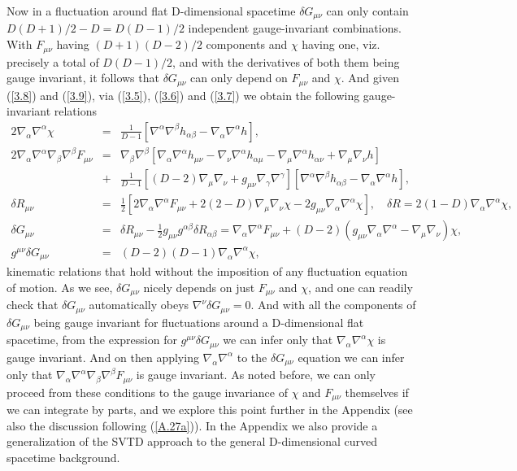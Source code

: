 \documentclass[aps,onecolumn,10pt]{revtex4}
\numberwithin{equation}{section}
\numberwithin{equation}{section}
\begin{document}
Now in a fluctuation around flat D-dimensional spacetime $\delta G_{\mu\nu}$ can only contain $D(D+1)/2-D=D(D-1)/2$ independent gauge-invariant combinations. With $F_{\mu\nu}$ having $(D+1)(D-2)/2$ components and $\chi$ having one, viz. precisely a total of $D(D-1)/2$, and  with the derivatives of both them being gauge invariant, it follows that $\delta G_{\mu\nu}$ can only depend on $F_{\mu\nu}$ and $\chi$. And given (\ref{3.8}) and (\ref{3.9}), via (\ref{3.5}), (\ref{3.6}) and (\ref{3.7}) we obtain  the following gauge-invariant relations
%
\begin{eqnarray}
2\nabla_{\alpha}\nabla^{\alpha}\chi&=&\frac{1}{D-1}\left[\nabla^{\alpha}\nabla^{\beta}h_{\alpha\beta}-\nabla_{\alpha}\nabla^{\alpha}h\right],
\nonumber\\
2\nabla_{\alpha}\nabla^{\alpha}\nabla_{\beta}\nabla^{\beta}F_{\mu\nu}&=&\nabla_{\beta}\nabla^{\beta}\left[\nabla_{\alpha}\nabla^{\alpha}h_{\mu\nu}-\nabla_{\nu}\nabla^{\alpha}h_{\alpha\mu}-\nabla_{\mu}\nabla^{\alpha}h_{\alpha\nu}+\nabla_{\mu}\nabla_{\nu}h\right]
\nonumber\\
&+&\frac{1}{D-1}\left[(D-2)\nabla_{\mu}\nabla_{\nu}+g_{\mu\nu}\nabla_{\gamma}\nabla^{\gamma}\right][\nabla^{\alpha}\nabla^{\beta}h_{\alpha\beta}-\nabla_{\alpha}\nabla^{\alpha}h],
\nonumber\\
\delta R_{\mu\nu}&=&\frac{1}{2}[2\nabla_{\alpha}\nabla^{\alpha}F_{\mu\nu}+2(2-D)\nabla_{\mu}\nabla_{\nu}\chi-2g_{\mu\nu}\nabla_{\alpha}\nabla^{\alpha}\chi], \quad \delta R=2(1-D)\nabla_{\alpha}\nabla^{\alpha}\chi,
\nonumber\\
\delta G_{\mu\nu}&=&\delta R_{\mu\nu}-\frac{1}{2}g_{\mu\nu}g^{\alpha\beta}\delta R_{\alpha\beta}=\nabla_{\alpha}\nabla^{\alpha}F_{\mu\nu}+(D-2)(g_{\mu\nu}\nabla_{\alpha}\nabla^{\alpha}-\nabla_{\mu}\nabla_{\nu})\chi,
\nonumber\\
g^{\mu\nu}\delta G_{\mu\nu}&=&(D-2)(D-1)\nabla_{\alpha}\nabla^{\alpha}\chi,
\label{3.10}
\end{eqnarray}
%
kinematic relations that hold without the imposition of any fluctuation equation of motion. As we see, $\delta G_{\mu\nu}$ nicely depends  on just $F_{\mu\nu}$ and $\chi$, and one can readily check that $\delta G_{\mu\nu}$ automatically obeys $\nabla^{\nu}\delta G_{\mu\nu}=0$.  And with all the components of $\delta G_{\mu\nu}$ being gauge invariant for fluctuations around a D-dimensional flat spacetime,  from the expression for $g^{\mu\nu}\delta G_{\mu\nu}$  we can infer only that $\nabla_{\alpha}\nabla^{\alpha}\chi$ is gauge invariant. And on then applying $\nabla_{\alpha}\nabla^{\alpha}$ to the $\delta G_{\mu\nu}$ equation we can infer only that $\nabla_{\alpha}\nabla^{\alpha}\nabla_{\beta}\nabla^{\beta}F_{\mu\nu}$ is gauge invariant. As noted before, we can only proceed from these conditions to the gauge invariance of $\chi$ and $F_{\mu\nu}$ themselves if we can integrate by parts, and we explore this point further in the Appendix (see also the discussion following (\ref{A.27a})). In the Appendix we also provide a generalization of the SVTD approach to the general D-dimensional curved spacetime background.
\end{document}
